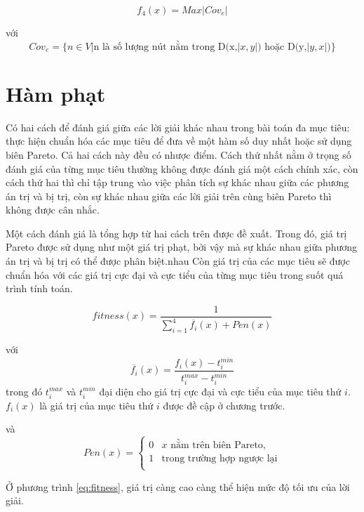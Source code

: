 \begin{equation}
f_4(x) = Max|Cov_e|
\end{equation}

với $$Cov_e = \{n \in V | \text{n là số lượng nút nằm trong D(x,$|x,y|$) hoặc D(y,$|y,x|$)} \}$$

\section{Hàm phạt}
Có hai cách để đánh giá giữa các lời giải khác nhau trong bài toán đa mục tiêu: thực hiện chuẩn hóa các mục tiêu để đưa về một hàm số duy nhất hoặc sử dụng biên Pareto. Cả hai cách này đều có nhược điểm. Cách thứ nhất nằm ở trọng số đánh giá của từng mục tiêu thường không được đánh giá một cách chính xác, còn cách thứ hai thì chỉ tập trung vào việc phân tích sự khác nhau giữa các phương án trị và bị trị, còn sự khác nhau giữa các lời giải trên cùng biên Pareto thì không được cân nhắc.


Một cách đánh giá là tổng hợp từ hai cách trên được đề xuất. Trong đó, giá trị Pareto được sử dụng như một giá trị phạt, bởi vậy mà sự khác nhau giữa phương án trị và bị trị có thể được phân biệt.nhau Còn giá trị của các mục tiêu sẽ được chuẩn hóa với các giá trị cực đại và cực tiểu của từng mục tiêu trong suốt quá trình tính toán.

\begin{equation}\label{eq:fitness}
fitness (x) = \frac{1}{\sum_{i=1}^4 \overline{f_i}(x) + Pen(x)}
\end{equation}

với
\begin{equation}\label{eq:newObjective}
\overline{f_i}(x) = \frac{f_i(x) - t^{min}_i}{t^{max}_i - t^{min}_i}
\end{equation}
trong đó $t^{max}_i$ và $t^{min}_i$ đại diện cho giá trị cực đại và cực tiểu của mục tiêu thứ $i$. $f_i(x)$ là giá trị của mục tiêu thứ $i$ được đề cập ở chương trước.

và
\begin{equation}
Pen(x) = \begin{cases}
0 & \text{$x$ nằm trên biên Pareto,}\\
1 & \text{trong trường hợp ngược lại}\\
\end{cases}
\end{equation}

Ở phương trình \ref{eq:fitness}, giá trị càng cao càng thể hiện mức độ tối ưu của lời giải.

